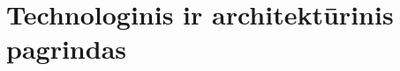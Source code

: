 \section{Technologinis ir architektūrinis pagrindas}
\label{sec:technologinis-architekturinis-pagrindas}




